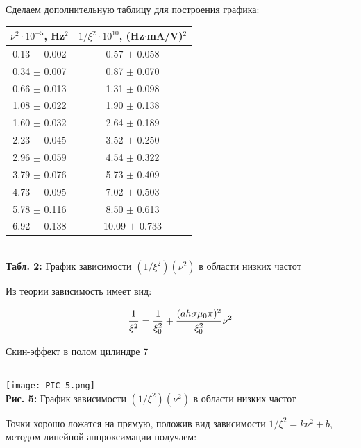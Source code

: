 \documentclass[12pt,a4paper]{scrartcl}
\begin{document}
	Сделаем дополнительную таблицу для построения графика:

	\begin{center}
		\begin{tabular}{|c|c|}
			\hline
			$\nu^2 \cdot 10^{-5}$, Hz$^2$ & $1/\xi^2 \cdot 10^{10}$, (Hz$\cdot$mA/V)$^2$
			\\\hline
			0.13 $\pm$ 0.002 & 0.57 $\pm$ 0.058
			\\\hline
			0.34 $\pm$ 0.007 & 0.87 $\pm$ 0.070
			\\\hline
			0.66 $\pm$ 0.013 & 1.31 $\pm$ 0.098
			\\\hline
			1.08 $\pm$ 0.022 & 1.90 $\pm$ 0.138
			\\\hline
			1.60 $\pm$ 0.032 & 2.64 $\pm$ 0.189
			\\\hline
			2.23 $\pm$ 0.045 & 3.52 $\pm$ 0.250
			\\\hline
			2.96 $\pm$ 0.059 & 4.54 $\pm$ 0.322
			\\\hline
			3.79 $\pm$ 0.076 & 5.73 $\pm$ 0.409
			\\\hline
			4.73 $\pm$ 0.095 & 7.02 $\pm$ 0.503
			\\\hline
			5.78 $\pm$ 0.116 & 8.50 $\pm$ 0.613
			\\\hline
			6.92 $\pm$ 0.138 & 10.09 $\pm$ 0.733
			\\\hline
		\end{tabular}
		\\\textbf{Табл. 2:} График зависимости $(1/\xi^2)(\nu^2)$ в области низких частот
	\end{center}
	
	Из теории зависимость имеет вид:
	
	$$\dfrac{\strut 1}{\strut \xi^2} = \dfrac{\strut 1}{\strut \xi_0^2} + \dfrac{\strut (ah\sigma \mu_0 \pi)^2}{\strut \xi_0^2}\nu^2$$
	
	\newpage
	
	\begin{flushleft}
		\footnotesize{Скин-эффект в полом цилиндре} \hspace{\fill} \footnotesize{7}
		\\[-0.3cm]\noindent\rule{\textwidth}{0.3pt}
	\end{flushleft}
	
	\begin{center}
		\texttt{[image: PIC\_5.png]}
		\\\textbf{Рис. 5:} График зависимости $(1/\xi^2)(\nu^2)$ в области низких частот
	\end{center}
	
	Точки хорошо ложатся на прямую, положив вид зависимости $1/\xi^2 = k\nu^2 + b$, методом линейной аппроксимации получаем:
	
\end{document}
